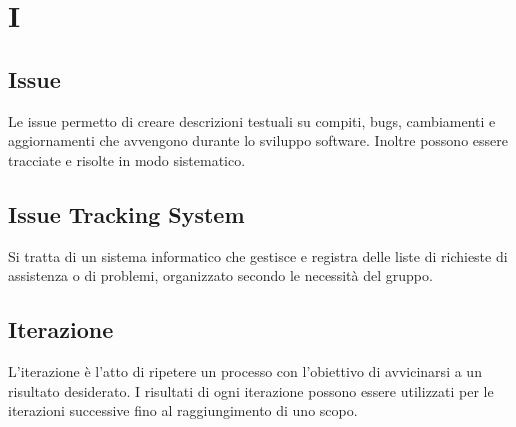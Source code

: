 \section{I}

\subsection{Issue}%
Le issue permetto di creare descrizioni testuali su compiti, bugs, cambiamenti e aggiornamenti che avvengono durante lo sviluppo software.  Inoltre possono essere tracciate e risolte in modo sistematico.

\subsection{Issue Tracking System}%
Si tratta di un sistema informatico che gestisce e registra delle liste di richieste di assistenza o di problemi, organizzato secondo le necessità del gruppo.

\subsection{Iterazione}%
L'iterazione è l'atto di ripetere un processo con l'obiettivo di avvicinarsi a un risultato desiderato.  I risultati di ogni iterazione possono essere utilizzati per le iterazioni successive fino al raggiungimento di uno scopo.
\clearpage